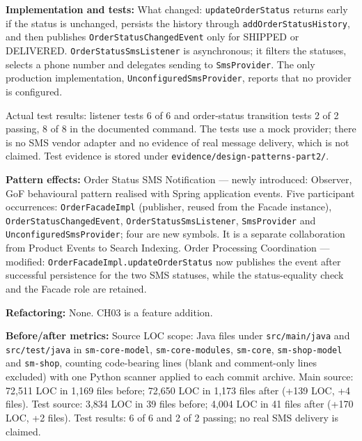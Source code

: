\documentclass[11pt,a4paper]{article}
\begin{document}
\textbf{Implementation and tests:} What changed: \texttt{update\allowbreak{}Order\allowbreak{}Status} returns early if the status is unchanged, persists the history through \texttt{add\allowbreak{}Order\allowbreak{}Status\allowbreak{}History}, and then publishes \texttt{Order\allowbreak{}Status\allowbreak{}Changed\allowbreak{}Event} only for SHIPPED or DELIVERED. \texttt{Order\allowbreak{}Status\allowbreak{}Sms\allowbreak{}Listener} is asynchronous; it filters the statuses, selects a phone number and delegates sending to \texttt{Sms\allowbreak{}Provider}. The only production implementation, \texttt{Unconfigured\allowbreak{}Sms\allowbreak{}Provider}, reports that no provider is configured.

Actual test results: listener tests 6 of 6 and order-status transition tests 2 of 2 passing, 8 of 8 in the documented command. The tests use a mock provider; there is no SMS vendor adapter and no evidence of real message delivery, which is not claimed. Test evidence is stored under \texttt{evidence/\allowbreak{}design-\allowbreak{}patterns-\allowbreak{}part2/\allowbreak{}}.

\textbf{Pattern effects:} Order Status SMS Notification --- newly introduced: Observer, GoF behavioural pattern realised with Spring application events. Five participant occurrences: \texttt{Order\allowbreak{}Facade\allowbreak{}Impl} (publisher, reused from the Facade instance), \texttt{Order\allowbreak{}Status\allowbreak{}Changed\allowbreak{}Event}, \texttt{Order\allowbreak{}Status\allowbreak{}Sms\allowbreak{}Listener}, \texttt{Sms\allowbreak{}Provider} and \texttt{Unconfigured\allowbreak{}Sms\allowbreak{}Provider}; four are new symbols. It is a separate collaboration from Product Events to Search Indexing. Order Processing Coordination --- modified: \texttt{OrderFacadeImpl.\allowbreak{}updateOrderStatus} now publishes the event after successful persistence for the two SMS statuses, while the status-equality check and the Facade role are retained.

\textbf{Refactoring:} None. CH03 is a feature addition.

\textbf{Before/after metrics:} Source LOC scope: Java files under \texttt{src/main/java} and \texttt{src/test/java} in \texttt{sm-core-model}, \texttt{sm-core-modules}, \texttt{sm-core}, \texttt{sm-shop-model} and \texttt{sm-shop}, counting code-bearing lines (blank and comment-only lines excluded) with one Python scanner applied to each commit archive. Main source: 72,511 LOC in 1,169 files before; 72,650 LOC in 1,173 files after (+139 LOC, +4 files). Test source: 3,834 LOC in 39 files before; 4,004 LOC in 41 files after (+170 LOC, +2 files). Test results: 6 of 6 and 2 of 2 passing; no real SMS delivery is claimed.
\end{document}
